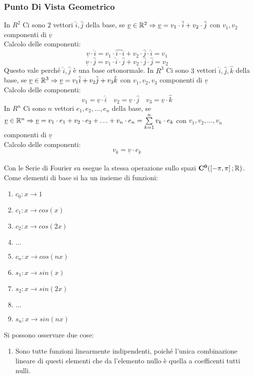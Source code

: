 \subsubsection{Punto Di Vista Geometrico}
In $R^2$ Ci sono $2$ vettori $\hat{i},\hat{j}$ della base, se $\underline{v}\in \mathbb{R}^2 \Rightarrow \underline{v}=v_1\cdot \hat{i}+v_2\cdot \hat{j}$ con $v_1,v_2$ componenti di $\underline{v}$\\
Calcolo delle componenti:\\
\[\underline{v}\cdot \hat{i} = v_1\cdot \hat{i\cdot }\hat{i}+v_2\cdot \hat{j}\cdot \hat{i}=v_1\]
\[\underline{v}\cdot \hat{j} = v_1\cdot \hat{i}\cdot \hat{j}+v_2\cdot \hat{j}\cdot \hat{j}=v_2\]
Questo vale perché $\hat{i},\hat{j}$ è una base ortonormale.
In $R^3$ Ci sono $3$ vettori $\hat{i},\hat{j},\hat{k}$ della base, se $\underline{v}\in \mathbb{R}^3 \Rightarrow \underline{v}=v_1\hat{i}+v_2\hat{j}+v_3\hat{k}$ con $v_1,v_2,v_3$ componenti di $\underline{v}$\\
Calcolo delle componenti:
\[ v_1=\underline{v}\cdot \hat{i}\quad v_2=\underline{v}\cdot \hat{j}\quad v_3=\underline{v}\cdot \hat{k}  \]
In $R^n$ Ci sono $n$ vettori $e_1,e_2,\dotsc,e_n$ della base, se $\underline{v}\in \mathbb{R}^n \Rightarrow \underline{v}=v_1\cdot e_1+v_2\cdot e_2+\ldots+v_n\cdot e_n=\sum\limits_{k=1}^{n}v_k\cdot e_k$ con $v_1,v_2,\dotsc,v_n$ componenti di $\underline{v}$\\
Calcolo delle componenti:
\[v_k=\underline{v}\cdot e_k\]
\\
Con le Serie di Fourier su esegue la stessa operazione sullo spazi $\mathbf{C^{0}}(\left[-\pi,\pi\right]; \mathbb{R})$. Come elementi di base si ha un insieme di funzioni:
\begin{enumerate}
	\item $c_0:x\to 1$
	\item $c_1:x\to cos(x)$
	\item $c_2:x\to cos(2x)$
	\item $\ldots$
	\item $c_n:x\to cos(nx)$
	\item $s_1:x\to sin(x)$
	\item $s_2:x\to sin(2x)$
	\item $\ldots$
	\item $s_n:x\to sin(nx)$
\end{enumerate}
Si possono osservare due cose:
\begin{enumerate}
	\item Sono tutte funzioni linearmente indipendenti, poiché l'unica combinazione lineare di questi elementi che da l'elemento nullo è quella a coefficenti tutti nulli.
\end{enumerate}

